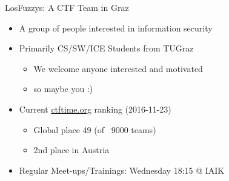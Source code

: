 \begin{frame}
  {LosFuzzys: A CTF Team in Graz}

  \begin{itemize}
    \item A group of people interested in information security
    \item Primarily CS/SW/ICE Students from TUGraz
      \begin{itemize}
        \item We welcome anyone interested and motivated 
        \item so maybe you :)
      \end{itemize}
    \item Current \href{https://ctftime.org/team/8323}{ctftime.org} ranking
      (2016-11-23)
      \begin{itemize}
        \item Global place 49 (of ~9000 teams)
        \item 2nd place in Austria
      \end{itemize}
    \item Regular Meet-ups/Trainings: Wednesday 18:15 @ IAIK
  \end{itemize}
\end{frame}


